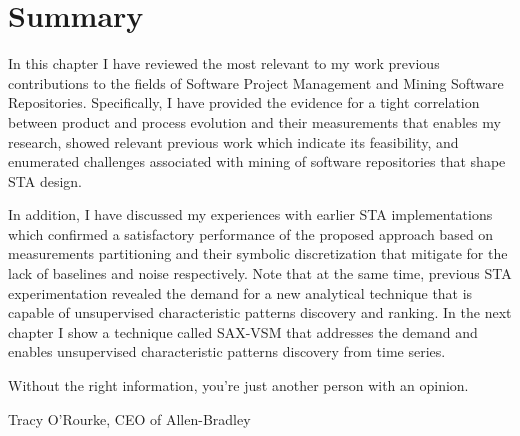 \section{Summary}
In this chapter I have reviewed the most relevant to my work previous contributions to the fields of Software Project Management 
and Mining Software Repositories. Specifically, I have provided the evidence for a tight correlation between product and process evolution 
and their measurements that enables my research, showed relevant previous work which indicate its feasibility,
and enumerated challenges associated with mining of software repositories that shape STA design. 

In addition, I have discussed my experiences with earlier STA implementations which confirmed a satisfactory performance of 
the proposed approach based on measurements partitioning and their symbolic discretization that mitigate for the lack of baselines 
and noise respectively. Note that at the same time, previous STA experimentation revealed the demand for a new analytical technique 
that is capable of unsupervised characteristic patterns discovery and ranking. In the next chapter I show a technique called SAX-VSM 
that addresses the demand and enables unsupervised characteristic patterns discovery from time series.

\epigraph{Without the right information, you're just another person with an opinion.}{Tracy O'Rourke, CEO of Allen-Bradley}